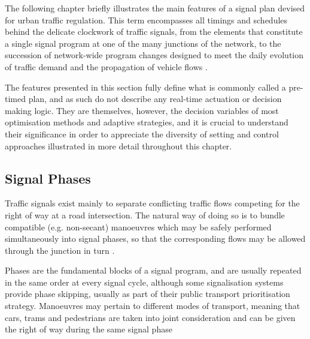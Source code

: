 The following chapter briefly illustrates the main features of a signal plan devised for urban traffic regulation.
This term encompasses all timings and schedules behind the delicate clockwork of traffic signals, from the elements that constitute a single signal program at one of the many junctions of the network, to the succession of network-wide program changes designed to meet the daily evolution of traffic demand and the propagation of vehicle flows .

The features presented in this section fully define what is commonly called a pre-timed plan, and as such do not describe any real-time actuation or decision making logic.
They are themselves, however, the decision variables of most optimisation methods and adaptive strategies, and it is crucial to understand their significance in order to appreciate the diversity of setting and control approaches illustrated in more detail throughout this chapter.


\subsection{Signal Phases}
Traffic signals exist mainly to separate conflicting traffic flows competing for the right of way at a road intersection. The natural way of doing so is to bundle compatible (e.g. non-secant) manoeuvres which may be safely performed simultaneously into signal phases, so that the corresponding flows may be allowed through the junction in turn .

Phases are the fundamental blocks of a signal program, and are usually repeated in the same order at every signal cycle, although some signalisation systems provide phase skipping, usually as part of their public transport prioritisation strategy.
Manoeuvres may pertain to different modes of transport, meaning that cars, trams and pedestrians are taken into joint consideration and can be given the right of way during the same signal phase

